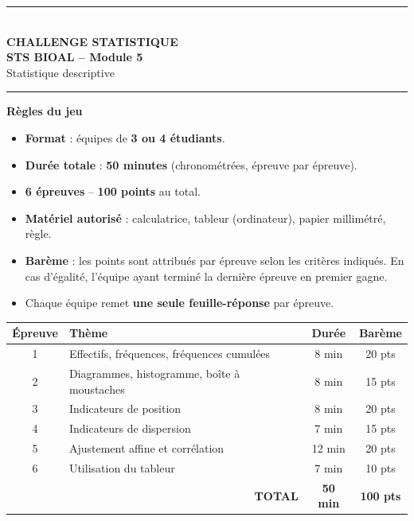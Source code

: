 \documentclass[11pt,a4paper]{article}
\begin{document}
\begin{center}
{\color{biocolor}\rule{\linewidth}{1.2pt}}\\[0.3cm]
{\Huge\bfseries\color{biocolor} CHALLENGE STATISTIQUE}\\[0.2cm]
{\Large\bfseries\color{bioaccent} STS BIOAL -- Module 5}\\[0.1cm]
{\large Statistique descriptive}\\[0.2cm]
{\color{biocolor}\rule{\linewidth}{1.2pt}}
\end{center}

\vspace{0.3cm}

\begin{regle}
\textbf{\large Règles du jeu}\\[0.2cm]
\begin{itemize}[leftmargin=*,itemsep=2pt]
  \item \textbf{Format} : équipes de \textbf{3 ou 4 étudiants}.
  \item \textbf{Durée totale} : \textbf{50 minutes} (chronométrées, épreuve par épreuve).
  \item \textbf{6 épreuves} -- \textbf{100 points} au total.
  \item \textbf{Matériel autorisé} : calculatrice, tableur (ordinateur), papier millimétré, règle.
  \item \textbf{Barème} : les points sont attribués par épreuve selon les critères indiqués. En cas d'égalité, l'équipe ayant terminé la dernière épreuve en premier gagne.
  \item Chaque équipe remet \textbf{une seule feuille-réponse} par épreuve.
\end{itemize}
\end{regle}

\vspace{0.3cm}

\begin{center}
\renewcommand{\arraystretch}{1.4}
\begin{tabular}{|c|l|c|c|}
\hline
\textbf{\'Epreuve} & \textbf{Thème} & \textbf{Durée} & \textbf{Barème} \\
\hline
1 & Effectifs, fréquences, fréquences cumulées & 8 min & 20 pts \\
2 & Diagrammes, histogramme, boîte à moustaches & 8 min & 15 pts \\
3 & Indicateurs de position & 8 min & 20 pts \\
4 & Indicateurs de dispersion & 7 min & 15 pts \\
5 & Ajustement affine et corrélation & 12 min & 20 pts \\
6 & Utilisation du tableur & 7 min & 10 pts \\
\hline
\multicolumn{2}{|r|}{\textbf{TOTAL}} & \textbf{50 min} & \textbf{100 pts} \\
\hline
\end{tabular}
\end{center}
\end{document}
